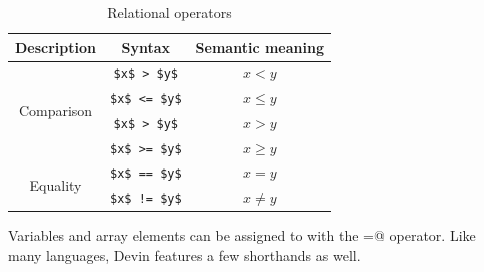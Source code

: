 \documentclass[UdineBachThesis,american,11pt]{PhdThesis}
\begin{document}
  \begin{table}[h]
    \centering

    \begin{tabular}{|c|c|c|}
      \hline

      Description &
      Syntax &
      Semantic meaning \\
      \hline

      \multirow{4}{*}{Comparison} &
      \lstinline[mathescape]@$x$ > $y$@ &
      $x < y$ \\

      &
      \lstinline[mathescape]@$x$ <= $y$@ &
      $x \leq y$ \\

      &
      \lstinline[mathescape]@$x$ > $y$@ &
      $x > y$ \\

      &
      \lstinline[mathescape]@$x$ >= $y$@ &
      $x \geq y$ \\

      \multirow{2}{*}{Equality} &
      \lstinline[mathescape]@$x$ == $y$@ &
      $x = y$ \\

      &
      \lstinline[mathescape]@$x$ != $y$@ &
      $x \neq y$ \\
      \hline
    \end{tabular}

    \caption{Relational operators}
  \end{table}

  Variables and array elements can be assigned to with the \lstinline@=@
  operator. Like many languages, Devin features a few shorthands as well.
\end{document}
